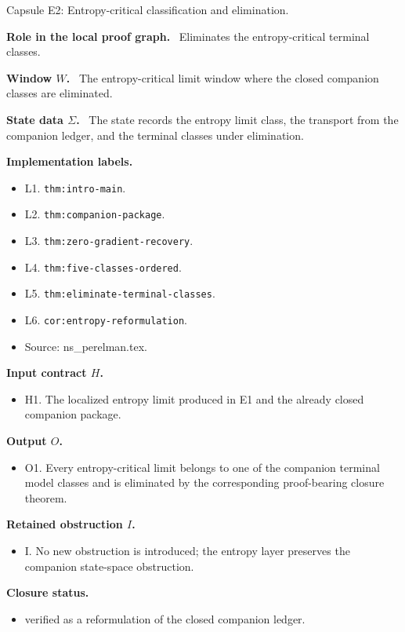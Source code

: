 \documentclass[11pt]{amsart}
\newcommand{\capsulefield}[1]{\par\smallskip\noindent\textbf{#1.}\ }
\begin{document}
\begin{proofcapsule}{Capsule E2: Entropy-critical classification and elimination.}
  \capsulefield{Role in the local proof graph}
  Eliminates the entropy-critical terminal classes.

  \capsulefield{Window \(W\)}
The entropy-critical limit window where the closed companion classes are eliminated.

  \capsulefield{State data \(\Sigma\)}
The state records the entropy limit class, the transport from the companion ledger, and the terminal classes under elimination.

  \capsulefield{Implementation labels}
  \begin{itemize}[leftmargin=1.8em]
  \item L1. \texttt{thm:intro-main}.
  \item L2. \texttt{thm:companion-package}.
  \item L3. \texttt{thm:zero-gradient-recovery}.
  \item L4. \texttt{thm:five-classes-ordered}.
  \item L5. \texttt{thm:eliminate-terminal-classes}.
  \item L6. \texttt{cor:entropy-reformulation}.
  \item Source: ns\_perelman.tex.
  \end{itemize}

  \capsulefield{Input contract \(H\)}
  \begin{itemize}[leftmargin=1.8em]
  \item H1. The localized entropy limit produced in E1 and the already closed companion package.
  \end{itemize}

  \capsulefield{Output \(O\)}
  \begin{itemize}[leftmargin=1.8em]
  \item O1. Every entropy-critical limit belongs to one of the companion terminal model classes and is eliminated by the corresponding proof-bearing closure theorem.
  \end{itemize}

  \capsulefield{Retained obstruction \(I\)}
  \begin{itemize}[leftmargin=1.8em]
  \item I. No new obstruction is introduced; the entropy layer preserves the companion state-space obstruction.
  \end{itemize}

  \capsulefield{Closure status}
  \begin{itemize}[leftmargin=1.8em]
  \item verified as a reformulation of the closed companion ledger.
  \end{itemize}
\end{proofcapsule}
\end{document}
